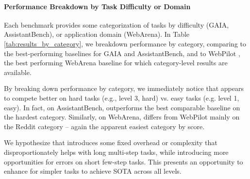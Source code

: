 \paragraph{Performance Breakdown by Task Difficulty or Domain} Each benchmark provides some categorization of tasks by difficulty (GAIA, AssistantBench), or application domain (WebArena). In Table \ref{tab:results_by_category}, we breakdown performance by category, comparing \team{}to the best-performing baselines for GAIA and AssistantBench, and to WebPilot \cite{zhang2024webpilotversatileautonomousmultiagent}, the best performing WebArena baseline for which category-level results are available.  

By breaking down performance by category, we immediately notice that \team appears to compete better on hard tasks (e.g., level 3, hard) vs. easy tasks (e.g. level 1, easy). In fact, on AssistantBench, \team outperforms the best comparable baseline on the hardest category. Similarly, on WebArena, \team differs from WebPilot mainly on the Reddit category -- again the apparent easiest category by score.

We hypothesize that \team introduces some fixed overhead or complexity that disproportionately helps with long multi-step tasks, while introducing more opportunities for errors on short few-step tasks. This presents an opportunity to enhance \team for simpler tasks to achieve SOTA across all levels. 

